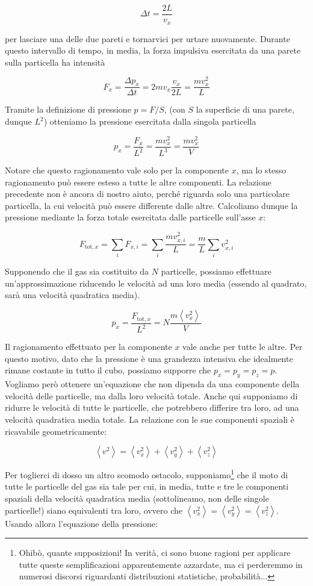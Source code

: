 \[ \Delta t = \frac{2L}{v_x} \]

\noindent per lasciare una delle due pareti e tornarvici per urtare nuovamente.
Durante questo intervallo di tempo, in media, la forza impulsiva
esercitata da una parete sulla particella ha intensità

\[ F_x = \frac{\Delta p_x}{\Delta t} = 2mv_x \frac{v_x}{2L} = \frac{mv_x^2}{L} \]

\noindent Tramite la definizione di pressione $p = F/S$, (con $S$ la
superficie di una parete, dunque $L^2$) otteniamo la
pressione esercitata dalla singola particella

\[ p_x = \frac{F_x}{L^2} = \frac{mv_x^2}{L^3} = \frac{mv_x^2}{V} \]

\noindent Notare che questo ragionamento vale solo per la componente
$x$, ma lo stesso ragionamento può essere esteso a tutte le altre
componenti. La relazione precedente non è ancora di nostro aiuto,
perché riguarda solo una particolare particella, la cui velocità può
essere differente dalle altre. Calcoliamo dunque la pressione mediante
la forza totale esercitata dalle particelle sull'asse $x$:

\[ F_{\text{tot}, x} = \sum_i F_{x,i} = \sum_i \frac{mv_{x,i}^2}{L} = \frac{m}{L}\sum_i v_{x,i}^2 \]

Supponendo che il gas sia costituito da $N$ particelle, possiamo
effettuare un'approssimazione riducendo le velocità ad una loro media
(essendo al quadrato, sarà una velocità quadratica media).

\[ p_x = \frac{F_{\text{tot},x}}{L^2} = N\frac{m\left\langle v_x^2 \right\rangle}{V} \]

Il ragionamento effettuato per la componente $x$ vale anche per tutte
le altre. Per questo motivo, dato che la pressione è una grandezza
intensiva che idealmente rimane costante in tutto il cubo, possiamo
supporre che $p_x = p_y = p_z = p$. Vogliamo però ottenere un'equazione
che non dipenda da una componente della velocità delle particelle,
ma dalla loro velocità totale. Anche qui supponiamo di ridurre le
velocità di tutte le particelle, che potrebbero differire tra loro,
ad una velocità quadratica media totale. La relazione con le sue
componenti spaziali è ricavabile geometricamente:

\[ \left\langle v^2 \right\rangle  = \left\langle v_x^2 \right\rangle + \left\langle v_y^2 \right\rangle + \left\langle v_z^2 \right\rangle \]

\noindent Per toglierci di dosso un altro scomodo ostacolo, supponiamo\footnote{Ohibò, quante supposizioni! In verità, ci sono buone ragioni per applicare tutte queste semplificazioni apparentemente azzardate, ma ci perderemmo in numerosi discorsi riguardanti distribuzioni statistiche, probabilità...}
che il moto di tutte le particelle del gas sia tale per cui, in media, tutte e tre le componenti spaziali della
velocità quadratica media (sottolineamo, non delle singole particelle!) siano equivalenti
tra loro, ovvero che $\left\langle v_x^2 \right\rangle = \left\langle v_y^2 \right\rangle = \left\langle v_z^2 \right\rangle$.
Usando allora l'equazione della pressione:

